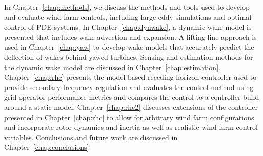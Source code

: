 In Chapter~\ref{chap:methods}, we discuss the methods and tools used to develop and evaluate wind farm controls, including large eddy simulations and optimal control of PDE systems. In Chapter~\ref{chap:dynwake}, a dynamic wake model is presented that includes wake advection and expansion. A lifting line approach is used in Chapter~\ref{chap:yaw} to develop wake models that accurately predict the deflection of wakes behind yawed turbines. Sensing and estimation methods for the dynamic wake model are discussed in Chapter~\ref{chap:estimation}. Chapter~\ref{chap:rhc} presents the model-based receding horizon controller used to provide secondary frequency regulation and evaluates the control method using grid operator performance metrics and compares the control to a controller build around a static model. Chapter~\ref{chap:rhc2} discusses extensions of the controller presented in Chapter~\ref{chap:rhc} to allow for arbitrary wind farm configurations and incorporate rotor dynamics and inertia as well as realistic wind farm control variables. Conclusions and future work are discussed in Chapter~\ref{chap:conclusions}.